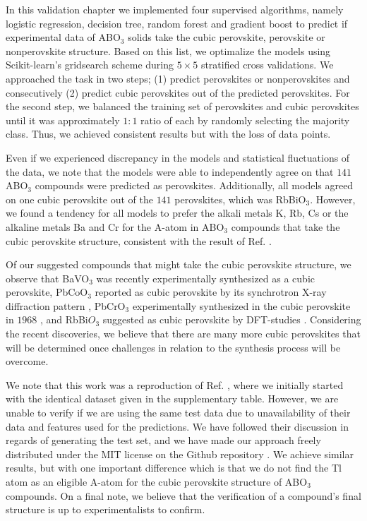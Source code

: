 In this validation chapter we implemented four supervised algorithms, namely logistic regression, decision tree, random forest and gradient boost to predict if experimental data of ABO$_3$ solids take the cubic perovskite, perovskite or nonperovskite structure. Based on this list, we optimalize the models using Scikit-learn's \cite{Pedregosa2012} gridsearch scheme during $5\times 5$ stratified cross validations. We approached the task in two steps; (1) predict perovskites or nonperovskites and consecutively (2) predict cubic perovskites out of the predicted perovskites. For the second step, we balanced the training set of perovskites and cubic perovskites until it was approximately $1:1$ ratio of each by randomly selecting the majority class. Thus, we achieved consistent results but with the loss of data points.

Even if we experienced discrepancy in the models and statistical fluctuations of the data, we note that the models were able to independently agree on that $141$ ABO$_3$ compounds were predicted as perovskites. Additionally, all models agreed on one cubic perovskite out of the $141$ perovskites, which was RbBiO$_3$. However, we found a tendency for all models to prefer the alkali metals K, Rb, Cs or the alkaline metals Ba and Cr for the A-atom in ABO$_3$ compounds that take the cubic perovskite structure, consistent with the result of Ref. \cite{Balachandran2018}.

Of our suggested compounds that might take the cubic perovskite structure, we observe that BaVO$_3$ was recently experimentally synthesized \cite{Nishimura2014} as a cubic perovskite, PbCoO$_3$ reported as cubic perovskite by its synchrotron X-ray diffraction pattern \cite{Sakai2017}, PbCrO$_3$ experimentally synthesized in the cubic perovskite in $1968$ \cite{DeVRIES1968}, and RbBi$O_3$ suggested as cubic perovskite by DFT-studies \cite{Khamari2017}. Considering the recent discoveries, we believe that there are many more cubic perovskites that will be determined once challenges in relation to the synthesis process will be overcome.


We note that this work was a reproduction of Ref. \cite{Balachandran2018}, where we initially started with the identical dataset given in the supplementary table. However, we are unable to verify if we are using the same test data due to unavailability of their data and features used for the predictions. We have followed their discussion in regards of generating the test set, and we have made our approach freely distributed under the MIT license on the Github repository \cite{Ohebbi2021a}. We achieve similar results, but with one important difference which is that we do not find the Tl atom as an eligible A-atom for the cubic perovskite structure of ABO$_3$ compounds. On a final note, we believe that the verification of a compound's final structure is up to experimentalists to confirm.
